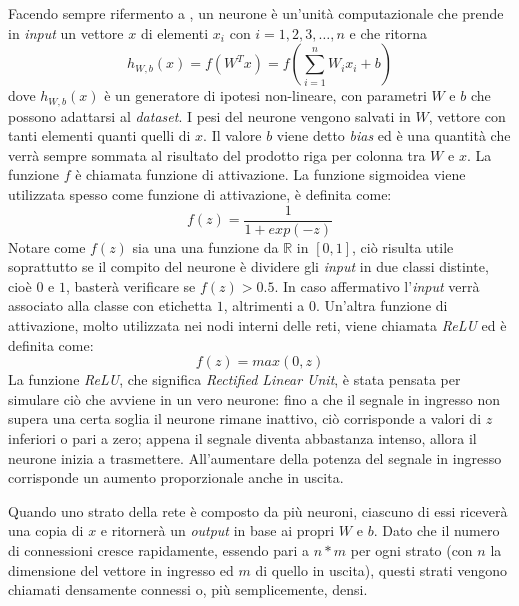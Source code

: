 Facendo sempre rifermento a \cite{ng_sparse_ae}, un neurone è un'unità computazionale che prende in \textit{input} un vettore $x$ di elementi $x_i$ con $i=1,2,3,\dots,n$ e che ritorna
\begin{equation*}
  h_{W,b}(x) = f(W^Tx) = f(\sum_{i=1}^{n} W_i x_i + b)
\end{equation*}
dove $h_{W,b}(x)$ è un generatore di ipotesi non-lineare, con parametri $W$ e $b$ che possono adattarsi al \textit{dataset}.
I pesi del neurone vengono salvati in $W$, vettore con tanti elementi quanti quelli di $x$.
Il valore $b$ viene detto \textit{bias} ed è una quantità che verrà sempre sommata al risultato del prodotto riga per colonna tra $W$ e $x$.
La funzione $f$ è chiamata funzione di attivazione.
La funzione sigmoidea viene utilizzata spesso come funzione di attivazione, è definita come:
\begin{equation*}
  f(z) = \frac{1}{1 + exp(-z)}
\end{equation*} %
Notare come $f(z)$ sia una una funzione da $\mathbb{R}$ in $[0,1]$, ciò risulta utile soprattutto se il compito del neurone è dividere gli \textit{input} in due classi distinte, cioè $0$ e $1$, basterà verificare se $f(z)>0.5$.
In caso affermativo l'\textit{input} verrà associato alla classe con etichetta $1$, altrimenti a $0$.
Un'altra funzione di attivazione, molto utilizzata nei nodi interni delle reti, viene chiamata \textit{ReLU} ed è definita come:
\begin{equation*}
  f(z) = max(0,z)
\end{equation*} %
La funzione \textit{ReLU}, che significa \textit{Rectified Linear Unit}, è stata pensata per simulare ciò che avviene in un vero neurone:
fino a che il segnale in ingresso non supera una certa soglia il neurone rimane inattivo, ciò corrisponde a valori di $z$ inferiori o pari a zero;
appena il segnale diventa abbastanza intenso, allora il neurone inizia a trasmettere.
All'aumentare della potenza del segnale in ingresso corrisponde un aumento proporzionale anche in uscita.

Quando uno strato della rete è composto da più neuroni, ciascuno di essi riceverà una copia di $x$ e ritornerà un \textit{output} in base ai propri $W$ e $b$.
Dato che il numero di connessioni cresce rapidamente, essendo pari a $n*m$ per ogni strato (con $n$ la dimensione del vettore in ingresso ed $m$ di quello in uscita), questi strati vengono chiamati densamente connessi o, più semplicemente, densi.

